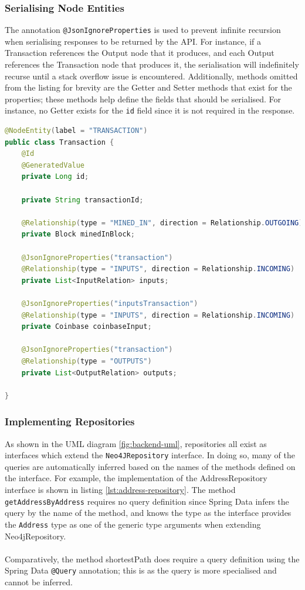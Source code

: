 \subsubsection{Serialising Node Entities}
The annotation \texttt{@JsonIgnoreProperties} is used to prevent infinite recursion when serialising responses to be returned by the API. For instance, if a Transaction references the Output node that it produces, and each Output references the Transaction node that produces it, the serialisation will indefinitely recurse until a stack overflow issue is encountered. Additionally, methods omitted from the listing for brevity are the Getter and Setter methods that exist for the properties; these methods help define the fields that should be serialised. For instance, no Getter exists for the \texttt{id} field since it is not required in the response. 

\begin{lstlisting}[language=Java, label={lst:node-entity-transaction}, caption={A transaction node entity}, breaklines=true, basicstyle=\small]
@NodeEntity(label = "TRANSACTION")
public class Transaction {
    @Id
    @GeneratedValue
    private Long id;

    private String transactionId;

    @Relationship(type = "MINED_IN", direction = Relationship.OUTGOING)
    private Block minedInBlock;

    @JsonIgnoreProperties("transaction")
    @Relationship(type = "INPUTS", direction = Relationship.INCOMING)
    private List<InputRelation> inputs;

    @JsonIgnoreProperties("inputsTransaction")
    @Relationship(type = "INPUTS", direction = Relationship.INCOMING)
    private Coinbase coinbaseInput;

    @JsonIgnoreProperties("transaction")
    @Relationship(type = "OUTPUTS")
    private List<OutputRelation> outputs;

}
\end{lstlisting}

\subsubsection{Implementing Repositories}
As shown in the UML diagram \ref{fig:backend-uml}, repositories all exist as interfaces which extend the \texttt{Neo4JRepository} interface. In doing so, many of the queries are automatically inferred based on the names of the methods defined on the interface. For example, the implementation of the AddressRepository interface is shown in listing \ref{lst:address-repository}. The method \texttt{getAddressByAddress} requires no query definition since Spring Data infers the query by the name of the method, and knows the type as the interface provides the \texttt{Address} type as one of the generic type arguments when extending Neo4jRepository. 
\\\\
Comparatively, the method shortestPath does require a query definition using the Spring Data \texttt{@Query} annotation; this is as the query is more specialised and cannot be inferred.

